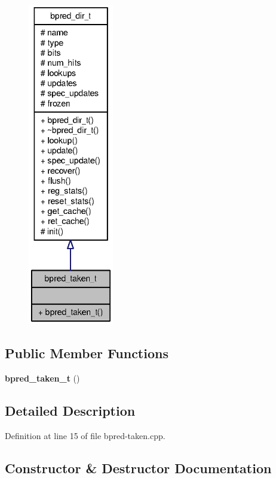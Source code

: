 \begin{figure}[H]
\begin{center}
\leavevmode
\includegraphics[height=400pt]{classbpred__taken__t__coll__graph}
\end{center}
\end{figure}
\subsection*{Public Member Functions}
\begin{CompactItemize}
\item 
{\bf bpred\_\-taken\_\-t} ()
\end{CompactItemize}


\subsection{Detailed Description}


Definition at line 15 of file bpred-taken.cpp.

\subsection{Constructor \& Destructor Documentation}
